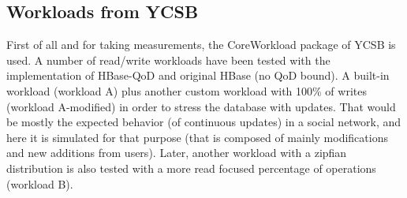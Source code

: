 \subsection{Workloads from YCSB}
First of all and for taking measurements, the CoreWorkload package of YCSB is used. A number of read/write workloads have been tested with the implementation of HBase-QoD and original HBase (no QoD bound). A built-in workload (workload A) plus another custom workload with 100\% of writes (workload A-modified) in order to stress the database with updates. That would be mostly the expected behavior (of continuous updates) in a social network, and here it is simulated for that purpose (that is composed of mainly modifications and new additions from users). Later, another workload with a zipfian distribution is also tested with a more read focused percentage of operations (workload B).

